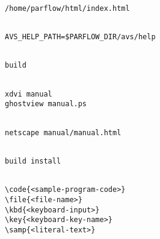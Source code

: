{\newpage\clearpage
{}%
\begin{display}\begin{verbatim}

/home/parflow/html/index.html\end{verbatim}
\end{display}%
\lthtmlfigureZ
\lthtmlcheckvsize\clearpage}

{\newpage\clearpage
{}%
\begin{display}\begin{verbatim}

AVS_HELP_PATH=$PARFLOW_DIR/avs/help\end{verbatim}
\end{display}%
\lthtmlfigureZ
\lthtmlcheckvsize\clearpage}

{\newpage\clearpage
{}%
\begin{display}\begin{verbatim}

build\end{verbatim}
\end{display}%
\lthtmlfigureZ
\lthtmlcheckvsize\clearpage}

{\newpage\clearpage
{}%
\begin{display}\begin{verbatim}

xdvi manual
ghostview manual.ps\end{verbatim}
\end{display}%
\lthtmlfigureZ
\lthtmlcheckvsize\clearpage}

{\newpage\clearpage
{}%
\begin{display}\begin{verbatim}

netscape manual/manual.html\end{verbatim}
\end{display}%
\lthtmlfigureZ
\lthtmlcheckvsize\clearpage}

{\newpage\clearpage
{}%
\begin{display}\begin{verbatim}

build install\end{verbatim}
\end{display}%
\lthtmlfigureZ
\lthtmlcheckvsize\clearpage}

{\newpage\clearpage
{}%
\begin{display}\begin{verbatim}

\code{<sample-program-code>}
\file{<file-name>}
\kbd{<keyboard-input>}
\key{<keyboard-key-name>}
\samp{<literal-text>}\end{verbatim}
\end{display}%
\lthtmlfigureZ
\lthtmlcheckvsize\clearpage}

